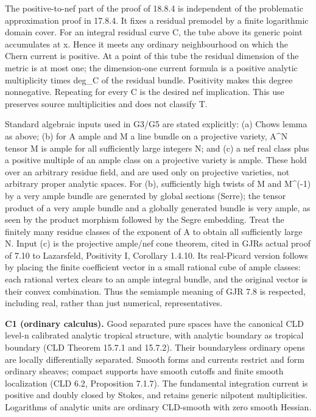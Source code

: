 \documentclass[
  11pt,
]{article}
\begin{document}
The positive-to-nef part of the proof of 18.8.4 is independent of the
problematic approximation proof in 17.8.4. It fixes a residual premodel
by a finite logarithmic domain cover. For an integral residual curve C,
the tube above its generic point accumulates at x. Hence it meets any
ordinary neighbourhood on which the Chern current is positive. At a
point of this tube the residual dimension of the metric is at most one;
the dimension-one current formula is a positive analytic multiplicity
times deg\_C of the residual bundle. Positivity makes this degree
nonnegative. Repeating for every C is the desired nef implication. This
use preserves source multiplicities and does not classify T.

Standard algebraic inputs used in G3/G5 are stated explicitly: (a)
Chow\textquotesingle s lemma as above; (b) for A ample and M a line
bundle on a projective variety, A\^{}N tensor M is ample for all
sufficiently large integers N; and (c) a nef real class plus a positive
multiple of an ample class on a projective variety is ample. These hold
over an arbitrary residue field, and are used only on projective
varieties, not arbitrary proper analytic spaces. For (b), sufficiently
high twists of M and M\^{}(-1) by a very ample bundle are generated by
global sections (Serre); the tensor product of a very ample bundle and a
globally generated bundle is very ample, as seen by the product morphism
followed by the Segre embedding. Treat the finitely many residue classes
of the exponent of A to obtain all sufficiently large N. Input (c) is
the projective ample/nef cone theorem, cited in GJR\textquotesingle s
actual proof of 7.10 to Lazarsfeld, Positivity I, Corollary 1.4.10. Its
real-Picard version follows by placing the finite coefficient vector in
a small rational cube of ample classes: each rational vertex clears to
an ample integral bundle, and the original vector is their convex
combination. Thus the semiample meaning of GJR 7.8 is respected,
including real, rather than just numerical, representatives.

\textbf{C1 (ordinary calculus).} Good separated pure spaces have the
canonical CLD level-n calibrated analytic tropical structure, with
analytic boundary as tropical boundary (CLD Theorem 15.7.1 and 15.7.2).
Their boundaryless ordinary opens are locally differentially separated.
Smooth forms and currents restrict and form ordinary sheaves; compact
supports have smooth cutoffs and finite smooth localization (CLD 6.2,
Proposition 7.1.7). The fundamental integration current is positive and
doubly closed by Stokes, and retains generic nilpotent multiplicities.
Logarithms of analytic units are ordinary CLD-smooth with zero smooth
Hessian.
\end{document}
